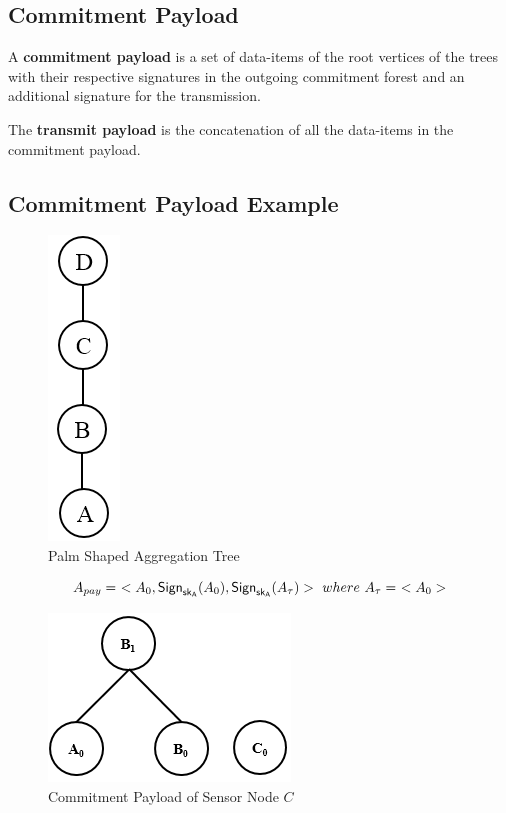 \documentclass[%
  slidesonly,%
  semlayer%
  ]{seminar}                                  %
\newcommand{\sk}{\sf{sk}}
\begin{document}
\begin{slide}
    \subsection*{Commitment Payload}
      \vfill
      A \textbf{commitment payload} is a set of data-items of the root vertices of the trees with their respective signatures in the outgoing commitment forest and an additional signature for the transmission.
    
      The \textbf{transmit payload} is the concatenation of all the data-items in the commitment payload.
      \vfill
      \clearpage

    \subsection*{Commitment Payload Example}
      \vfill
      \begin{figure}[h!]
        \centering
        \includegraphics[scale = 0.5]{images/palm-aggregation-tree.png}
        \caption{Palm Shaped Aggregation Tree}
        \label{fig:Palm aggregation tree}
      \end{figure}

      \begin{equation*}
        A_{pay} =\ <A_{0}, \textsf{Sign}_{\sk_{A}}(A_{0}), \textsf{Sign}_{\sk_{A}}(A_{\tau}) >\ where\ A_{\tau} =\ < A_{0} > 
      \end{equation*}

      \begin{figure}[h!]
        \centering
        \includegraphics[scale = 0.5]{images/commitment-payload-of-C.png}
        \caption{Commitment Payload of Sensor Node $C$}
        \label{fig:Commitment payload of C}
      \end{figure}


\end{slide}
\end{document}
